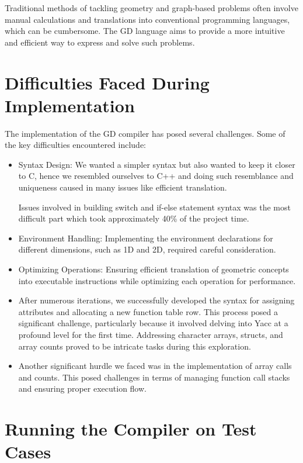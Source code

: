 \documentclass{article}
\begin{document}
Traditional methods of tackling geometry and graph-based problems often involve manual calculations and translations into conventional programming languages, which can be cumbersome. The GD language aims to provide a more intuitive and efficient way to express and solve such problems.

\section{Difficulties Faced During Implementation}
The implementation of the GD compiler has posed several challenges. Some of the key difficulties encountered include:

\begin{itemize}
    \item Syntax Design: We wanted a simpler syntax but also wanted to keep it closer to C, hence we resembled ourselves to C++ and doing such resemblance and uniqueness caused in many issues like efficient translation.
    
    Issues involved in building switch and if-else statement syntax was the most difficult part which took approximately 40\% of the project time.
    
    \item Environment Handling: Implementing the environment declarations for different dimensions, such as 1D and 2D, required careful consideration.
    
    \item Optimizing Operations: Ensuring efficient translation of geometric concepts into executable instructions while optimizing each operation for performance.
    
    \item After numerous iterations, we successfully developed the syntax for assigning attributes and allocating a new function table row. This process posed a significant challenge, particularly because it involved delving into Yacc at a profound level for the first time. Addressing character arrays, structs, and array counts proved to be intricate tasks during this exploration.
    
    \item Another significant hurdle we faced was in the implementation of array calls and counts. This posed challenges in terms of managing function call stacks and ensuring proper execution flow.
\end{itemize}

\section{Running the Compiler on Test Cases}
\end{document}
